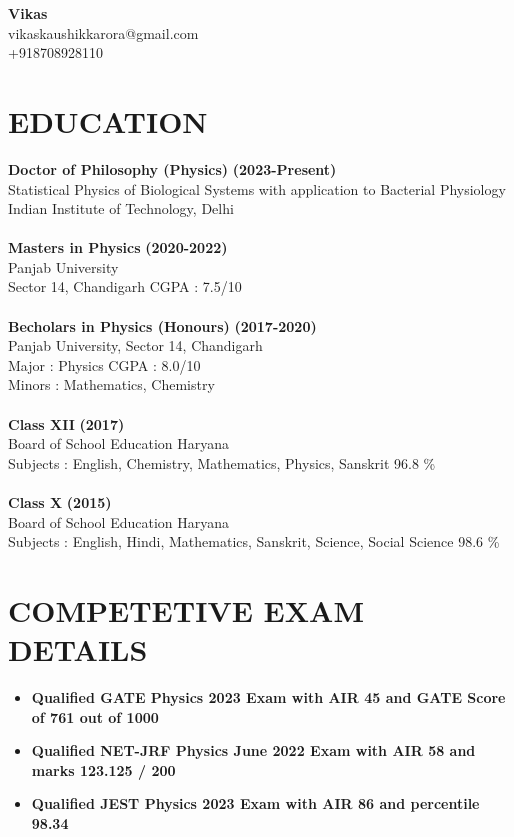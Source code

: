 \documentclass[12pt]{article}
\begin{document}
\begin{center}
\thispagestyle{empty}
\textbf{\Huge Vikas \\}
\normalsize{\small vikaskaushikkarora@gmail.com}\\
\normalsize{\small +918708928110}\\
\vspace{0.5em}
\end{center}
\section*{EDUCATION}
\textbf{Doctor of Philosophy (Physics)} \hfill \textbf{(2023-Present)}\\
Statistical Physics of Biological Systems with application to Bacterial Physiology\\
Indian Institute of Technology, Delhi \\ \\
\textbf{Masters in Physics} \hfill \textbf{(2020-2022)}\\
Panjab University \\
Sector 14, Chandigarh \hfill  CGPA : 7.5/10 \\ \\
\textbf{Becholars in Physics (Honours)} \hfill \textbf{(2017-2020)}\\
Panjab University, Sector 14, Chandigarh \\
Major : Physics \hfill  CGPA : 8.0/10 \\
Minors : Mathematics, Chemistry \\ \\
\textbf{Class XII} \hfill \textbf{(2017)}\\
Board of School Education Haryana\\
Subjects : English, Chemistry, Mathematics, Physics, Sanskrit \hfill 96.8 \% \\ \\
\textbf{Class X} \hfill \textbf{(2015)}\\
Board of School Education Haryana\\
Subjects : English, Hindi, Mathematics, Sanskrit, Science, Social Science \hfill 98.6 \% \\

\section*{COMPETETIVE EXAM DETAILS}
\begin{itemize}
        \item{\bfseries Qualified GATE Physics 2023 Exam with AIR 45 and GATE Score of 761 out of 1000}
        \item{\bfseries Qualified NET-JRF Physics June 2022 Exam with AIR 58 and marks 123.125 / 200}
        \item {\bfseries Qualified JEST Physics 2023 Exam with AIR 86 and percentile 98.34}
\end{itemize}
\end{document}

